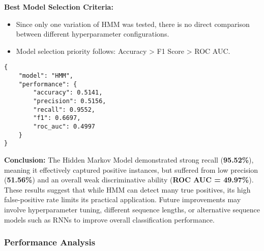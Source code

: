 \textbf{Best Model Selection Criteria:}

\begin{itemize}
    \item Since only one variation of HMM was tested, there is no direct comparison between different hyperparameter configurations.
    \item Model selection priority follows: Accuracy > F1 Score > ROC AUC.
\end{itemize}

\begin{verbatim}
{
    "model": "HMM",
    "performance": {
        "accuracy": 0.5141,
        "precision": 0.5156,
        "recall": 0.9552,
        "f1": 0.6697,
        "roc_auc": 0.4997
    }
}
\end{verbatim}

\textbf{Conclusion:} The Hidden Markov Model demonstrated strong recall (\textbf{95.52\%}), meaning it effectively captured positive instances, but suffered from low precision (\textbf{51.56\%}) and an overall weak discriminative ability (\textbf{ROC AUC = 49.97\%}). These results suggest that while HMM can detect many true positives, its high false-positive rate limits its practical application. Future improvements may involve hyperparameter tuning, different sequence lengths, or alternative sequence models such as RNNs to improve overall classification performance.

\subsubsection{Performance Analysis}

